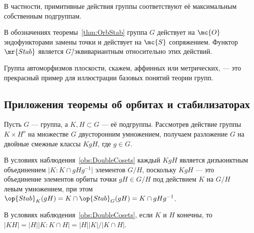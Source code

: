 \documentclass[
	extrafontsizes,
	11pt,
	hyphens,
]{memoir}
\begin{document}
\begin{remark}
В частности, примитивные действия группы соответствуют её максимальным собственным подгруппам.
\end{remark}

\begin{remark}
В обозначениях теоремы~\ref{thm:OrbStab} группа \(G\) действует на \(\mc{O}\) эндофункторами замены точки и действует на \(\mc{S}\) сопряжением.
Функтор \(\mr{Stab}\) является \(G\)\=/эквивариантным относительно этих действий.
\end{remark}

\begin{remark}
Группа автоморфизмов плоскости, скажем, аффинных или метрических, --- это прекрасный пример для иллюстрации базовых понятий теории групп.
\end{remark}

\subsection{Приложения теоремы об орбитах и стабилизаторах}

\begin{observation} \label{obs:DoubleCosets}
Пусть \(G\) --- группа, а \(K,H \subset G\) --- её подгруппы.
Рассмотрев действие группы \(K \times H^o\) на множестве \(G\) двусторонним умножением,
получаем разложение \(G\) на двойные смежные классы \(KgH\), где \(g \in G\).
\end{observation}

\begin{observation}
В условиях наблюдения~\ref{obs:DoubleCosets} каждый \(KgH\) является дизъюнктным объединением \(\lvert K : K \cap gHg^{-1} \rvert\)
элементов \(G/H\),
поскольку \(KgH\) --- это объединение элементов орбиты точки \(gH \in G/H\) под
действием \(K\) на
\(G/H\) левым умножением,
при этом
\(\op{Stab}_K(gH) = K \cap \op{Stab}_G(gH) = K \cap gHg^{-1}\).
\end{observation}

\begin{corollary}
В условиях наблюдения~\ref{obs:DoubleCosets}, если \(K\) и \(H\) конечны, то \(\lvert KH \rvert = \lvert H \rvert \lvert K : K \cap H \rvert = \lvert H \rvert \lvert K \rvert / \lvert K \cap H \rvert\).
\end{corollary}
\end{document}
